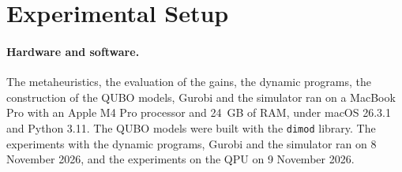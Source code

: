 \documentclass[10pt,twoside,twocolumn,a4paper]{article}
\newif\ifrevmarks \revmarksfalse
\newcommand{\rev}[1]{\ifrevmarks\textcolor{red}{#1}\else#1\fi}
\newenvironment{revblock}{\ifrevmarks\color{red}\fi}{}
\begin{document}
\section{\rev{Experimental Setup}}\label{sec:setup}
\begin{revblock}
\paragraph{Hardware and software.} The metaheuristics, the evaluation of the gains, the dynamic programs, the construction of the QUBO models, Gurobi and the simulator ran on a MacBook Pro with an Apple M4 Pro processor and 24~GB of RAM, under macOS 26.3.1 and Python 3.11. The QUBO models were built with the \texttt{dimod} library. The experiments with the dynamic programs, Gurobi and the simulator ran on 8 November 2026, and the experiments on the QPU on 9 November 2026.


\end{revblock}
\end{document}
